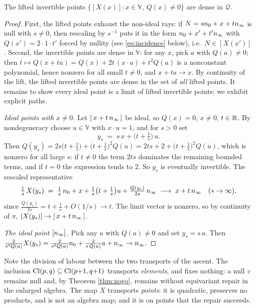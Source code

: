 \begin{lemma}[Density]\label{lem:density}
The lifted invertible points $\{[X(x)] : x \in \mathbb{V},\ Q(x) \neq 0\}$ are dense in $\mathcal{Q}$.
\end{lemma}

\begin{proof}
First, the lifted points exhaust the non-ideal rays: if $N = sn_0 + x + tn_\infty$ is null with $s \neq 0$, then rescaling by $s^{-1}$ puts it in the form $n_0 + x' + t'n_\infty$ with $Q(x') = 2 \cdot 1 \cdot t'$ forced by nullity (see \eqref{eq:incidence} below), i.e.\ $N \in [X(x')]$. Second, the invertible points are dense in $\mathbb{V}$: for any $x$, pick $a$ with $Q(a) \neq 0$; then $t \mapsto Q(x + ta) = Q(x) + 2t\,(x \cdot a) + t^2 Q(a)$ is a nonconstant polynomial, hence nonzero for all small $t \neq 0$, and $x + ta \to x$. By continuity of the lift, the lifted invertible points are dense in the set of \emph{all} lifted points. It remains to show every ideal point is a limit of lifted invertible points; we exhibit explicit paths.

\emph{Ideal points with $x \neq 0$.} Let $[\,x + t\,n_\infty\,]$ be ideal, so $Q(x) = 0$, $x \neq 0$, $t \in \mathbb{R}$. By nondegeneracy choose $u \in \mathbb{V}$ with $x \cdot u = 1$, and for $s > 0$ set
\[
y_s \;=\; s\,x + \bigl(t + \tfrac{1}{s}\bigr)\,u .
\]
Then $Q(y_s) = 2s\bigl(t + \tfrac1s\bigr) + \bigl(t + \tfrac1s\bigr)^2 Q(u) = 2ts + 2 + \bigl(t + \tfrac1s\bigr)^2 Q(u)$, which is nonzero for all large $s$: if $t \neq 0$ the term $2ts$ dominates the remaining bounded terms, and if $t = 0$ the expression tends to $2$. So $y_s$ is eventually invertible. The rescaled representative
\[
\tfrac{1}{s}\,X(y_s) \;=\; \tfrac{1}{s}\,n_0 + x + \tfrac{1}{s}\bigl(t + \tfrac1s\bigr)u + \tfrac{Q(y_s)}{2s}\,n_\infty
\;\longrightarrow\; x + t\,n_\infty \quad (s \to \infty),
\]
since $\tfrac{Q(y_s)}{2s} = t + \tfrac1s + O(1/s) \to t$. The limit vector is nonzero, so by continuity of $\pi$, $[X(y_s)] \to [\,x + t\,n_\infty\,]$.

\emph{The ideal point $[n_\infty]$.} Pick any $a$ with $Q(a) \neq 0$ and set $y_s = s\,a$. Then $\tfrac{2}{s^2 Q(a)} X(y_s) = \tfrac{2}{s^2 Q(a)} n_0 + \tfrac{2}{s\,Q(a)}a + n_\infty \to n_\infty$.
\end{proof}

Note the division of labour between the two transports of the ascent. The inclusion $\mathrm{Cl}(p,q) \subseteq \mathrm{Cl}(p{+}1,q{+}1)$ transports \emph{elements}, and fixes nothing: a null $v$ remains null and, by Theorem \ref{thm:nogo}, remains without equivariant repair in the enlarged algebra. The map $X$ transports \emph{points}: it is quadratic, preserves no products, and is not an algebra map; and it is on points that the repair succeeds.

